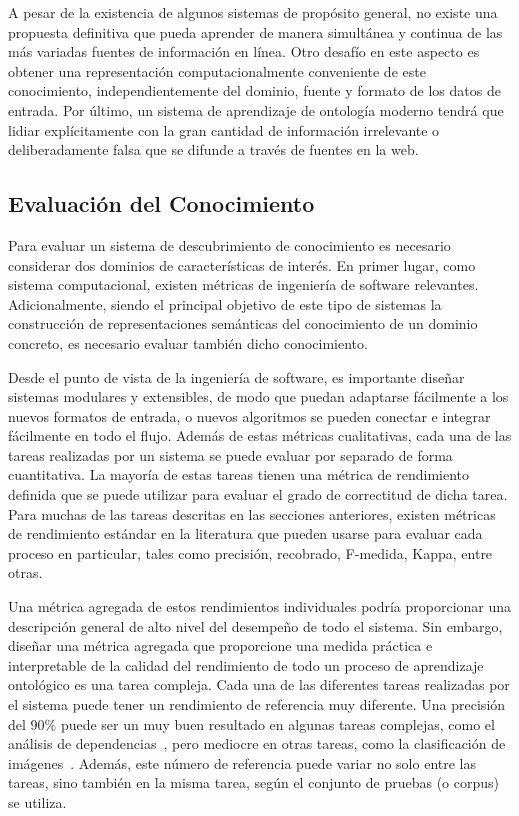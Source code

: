 A pesar de la existencia de algunos sistemas de propósito general, no existe una propuesta definitiva que pueda aprender de manera simultánea y continua de las más variadas fuentes de información en línea.
Otro desafío en este aspecto es obtener una representación computacionalmente conveniente de este conocimiento, independientemente del dominio, fuente y formato de los datos de entrada.
Por último, un sistema de aprendizaje de ontología moderno tendrá que lidiar explícitamente con la gran cantidad de información irrelevante o deliberadamente falsa que se difunde a través de fuentes en la web.

\subsection{Evaluación del Conocimiento}\label{sec: evaluación}

Para evaluar un sistema de descubrimiento de conocimiento es necesario considerar dos dominios de características de interés.
En primer lugar, como sistema computacional, existen métricas de ingeniería de software relevantes.
Adicionalmente, siendo el principal objetivo de este tipo de sistemas la construcción de representaciones semánticas del conocimiento de un dominio concreto, es necesario evaluar también dicho conocimiento.

Desde el punto de vista de la ingeniería de software, es importante diseñar sistemas modulares y extensibles, de modo que puedan adaptarse fácilmente a los nuevos formatos de entrada, o nuevos algoritmos se pueden conectar e integrar fácilmente en todo el flujo.
Además de estas métricas cualitativas, cada una de las tareas realizadas por un sistema se puede evaluar por separado de forma cuantitativa.
La mayoría de estas tareas tienen una métrica de rendimiento definida que se puede utilizar para evaluar el grado de correctitud de dicha tarea.
Para muchas de las tareas descritas en las secciones anteriores, existen métricas de rendimiento estándar en la literatura que pueden usarse para evaluar cada proceso en particular, tales como precisión, recobrado, F-medida, Kappa, entre otras.

Una métrica agregada de estos rendimientos individuales podría proporcionar una descripción general de alto nivel del desempeño de todo el sistema.
Sin embargo, diseñar una métrica agregada que proporcione una medida práctica e interpretable de la calidad del rendimiento de todo un proceso de aprendizaje ontológico es una tarea compleja.
Cada una de las diferentes tareas realizadas por el sistema puede tener un rendimiento de referencia muy diferente.
Una precisión del $90\%$ puede ser un muy buen resultado en algunas tareas complejas, como el análisis de dependencias~\cite{AlbertiABCGKKMO17}, pero mediocre en otras tareas, como la clasificación de imágenes~\cite{Russakovsky2015}.
Además, este número de referencia puede variar no solo entre las tareas, sino también en la misma tarea, según el conjunto de pruebas (o corpus) se utiliza.

